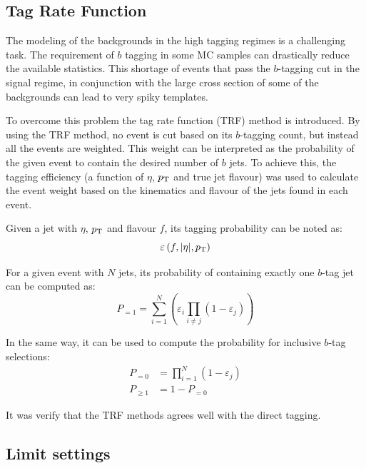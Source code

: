 \documentclass{cernrep}
\begin{document}
\clearpage
\newpage

\subsection{Tag Rate Function}
\label{subsec:trf}
The modeling of the backgrounds in the high tagging regimes is a challenging task. 
The requirement of $b$ tagging in some MC samples can drastically reduce the available statistics.
This shortage of events that pass the $b$-tagging cut in the signal regime, in conjunction with the large cross section of some of the backgrounds can lead to very spiky templates. 

To overcome this problem the tag rate function (TRF) method is introduced. 
By using the TRF method, no event is cut based on its $b$-tagging count, but instead all the events are weighted.
This weight can be interpreted as the probability of the given event to contain the desired number of $b$ jets. 
To achieve this, the tagging efficiency (a function of $\eta$, $p_{\text{T}}$ and true jet flavour) was
used to calculate the event weight based on the kinematics and flavour of the jets found in each event.

Given a jet with $\eta$, $p_{\text{T}}$ and flavour $f$, its tagging probability can be noted as:
\begin{equation*}
	\varepsilon \left(f,|\eta|,p_{\text{T}}\right)
\end{equation*}

For a given event with $N$ jets, its probability of containing exactly one $b$-tag jet can be computed as:
\begin{equation*}
	P_{=1} = \sum\limits_{i=1}^N \left( \varepsilon_{i} \prod\limits_{i \neq j} \left( 1 - \varepsilon_{j} \right) \right)
\end{equation*}

In the same way, it can be used to compute the probability for inclusive $b$-tag selections:
\begin{align*}
	P_{=0} &= \prod\limits_{i=1}^N \left( 1 - \varepsilon_{j} \right) \\
	P_{\geq 1} &= 1 - P_{=0}
\end{align*}



It was verify that the TRF methods agrees well with the direct tagging.


\subsection{Limit settings}
\label{subsec:limitsettings}
\end{document}
